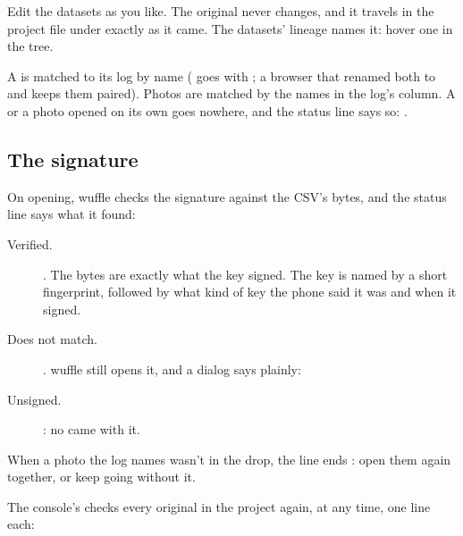 Edit the datasets as you like. The original never changes, and it travels in the project file under
 exactly as it came. The datasets' lineage names it: hover one in the tree.


A  is matched to its log by name ( goes with ; a
browser that renamed both to  and  keeps them
paired). Photos are matched by the names in the log's  column. A  or a photo opened
on its own goes nowhere, and the status line says so: .

\subsection{The signature}

On opening, wuffle checks the signature against the CSV's bytes, and the status line says what it found:

\begin{description}
\item[Verified.] . The bytes are exactly what the key signed. The key is
named by a short fingerprint, followed by what kind of key the phone said it was and when it signed.
\item[Does not match.] . wuffle still opens it, and a dialog says
plainly: 
\item[Unsigned.] : no  came with it.
\end{description}

When a photo the log names wasn't in the drop, the line ends : open them again together, or keep going without it.

The console's  checks every original in the project again, at any time, one line each:

